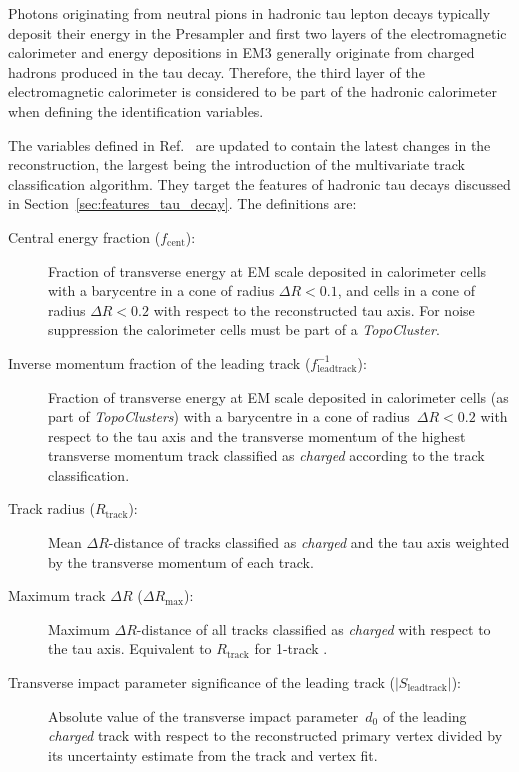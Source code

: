 Photons originating from neutral pions in hadronic tau lepton decays typically
deposit their energy in the Presampler and first two layers of the
electromagnetic calorimeter and energy depositions in EM3 generally originate
from charged hadrons produced in the tau decay. Therefore, the third layer of
the electromagnetic calorimeter is considered to be part of the hadronic
calorimeter when defining the identification variables.

The variables defined in Ref.~\cite{atlas:taurec:run2} are updated to contain
the latest changes in the reconstruction, the largest being the introduction of
the multivariate track classification algorithm. They target the features of
hadronic tau decays discussed in Section~\ref{sec:features_tau_decay}. The
definitions are:
\begin{description}
\item[Central energy fraction ($f_\text{cent}$):] Fraction of transverse energy
  at EM scale deposited in calorimeter cells with a barycentre in a cone of
  radius $\Delta R < 0.1$, and cells in a cone of radius $\Delta R < 0.2$ with
  respect to the reconstructed tau axis.
  For noise suppression the calorimeter cells must be part of a
  \emph{TopoCluster}.

\item[Inverse momentum fraction of the leading track
  ($f_\text{leadtrack}^{-1}$):] Fraction of transverse energy at EM scale
  deposited in calorimeter cells (as part of \emph{TopoClusters}) with a
  barycentre in a cone of radius~$\Delta R < 0.2$ with respect to the tau axis
  and the transverse momentum of the highest transverse momentum track
  classified as \emph{charged} according to the track classification.

\item[Track radius ($R_\text{track}$):] Mean $\Delta R$-distance of tracks
  classified as \emph{charged} and the tau axis weighted by the transverse
  momentum of each track.

\item[Maximum track $\Delta R$ ($\Delta R_\text{max}$):] Maximum
  $\Delta R$-distance of all tracks classified as \emph{charged} with respect to
  the tau axis. Equivalent to $R_\text{track}$ for 1-track \tauhadvis.

\item[Transverse impact parameter significance of the leading track
  ($| S_\text{leadtrack} |$):] Absolute value of the transverse impact
  parameter~$d_0$ of the leading \emph{charged} track with respect to the
  reconstructed primary vertex divided by its uncertainty estimate from the
  track and vertex fit.


\end{description}
